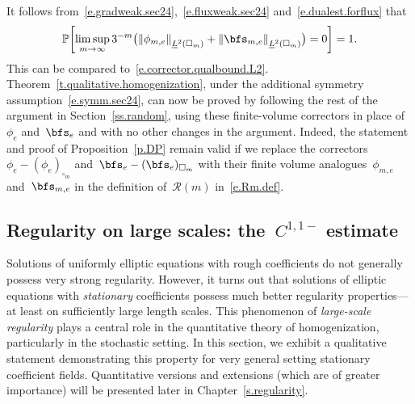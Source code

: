 \documentclass[11pt,twoside]{article} %
\let\oldsquare\square %
\renewcommand{\square}{\oldsquare}
\numberwithin{equation}{section}
\theoremstyle{definition}
\let\originalleft\left
\let\originalright\right
\renewcommand{\left}{\mathopen{}\mathclose\bgroup\originalleft}
\renewcommand{\right}{\aftergroup\egroup\originalright}
\newcommand{\cu}{\square}
\renewcommand{\P}{\mathbb{P}}
\begin{document}
\smallskip

It follows from~\eqref{e.gradweak.sec24},~\eqref{e.fluxweak.sec24} and~\eqref{e.dualest.forflux} that 
\begin{equation}
\label{e.corrector.qualbound.L2.sec24}
\P \biggl[ 
\limsup_{m\to \infty}
3^{-m} 
\bigl(
\left\|  \phi_{m,e}  \right\|_{\underline{L}^{2}(\cu_m)}
+
\left\|  \bfs_{m,e}  \right\|_{\underline{L}^{2}(\cu_m)}
\bigr) = 0 \biggr] = 1. 
\end{equation}
This can be compared to~\eqref{e.corrector.qualbound.L2}. Theorem~\ref{t.qualitative.homogenization}, under the additional symmetry assumption~\eqref{e.symm.sec24}, can now be proved by following the rest of the argument in Section~\ref{ss.random}, using these finite-volume correctors in place of~$\phi_e$ and~$\bfs_e$ and with no other changes in the argument. Indeed, the statement and proof of Proposition~\ref{p.DP} remain valid if we replace the correctors~$\phi_e - (\phi_e)_{\cu_m}$ and~$\bfs_e - (\bfs_e)_{\cu_m}$ with their finite volume analogues~$\phi_{m,e}$ and~$\bfs_{m,e}$ in the definition of~$\mathcal{R}(m)$ in~\eqref{e.Rm.def}. 



\subsection{Regularity on large scales: the~\texorpdfstring{$C^{1,1-}$}{{C11-}} estimate}
\label{ss.reg}

Solutions of uniformly elliptic equations with rough coefficients do not generally possess very strong regularity. However, it turns out that solutions of elliptic equations with \emph{stationary} coefficients possess much better regularity properties---at least on sufficiently large length scales. 
This phenomenon of \emph{large-scale regularity} plays a central role in the quantitative theory of homogenization, particularly in the stochastic setting. 
In this section, we exhibit a qualitative statement demonstrating this property for very general setting stationary coefficient fields. Quantitative versions and extensions (which are of greater importance) will be presented later in Chapter~\ref{s.regularity}.

\smallskip
\end{document}
